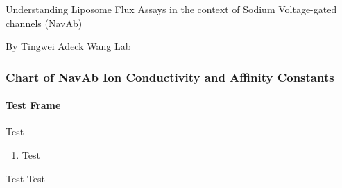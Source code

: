 \documentclass{beamer}
\begin{document}
\begin{frame}
\begin{center}
Understanding Liposome Flux Assays \linebreak in the context of Sodium Voltage-gated channels (NavAb)

By Tingwei Adeck
\linebreak
Wang Lab
\end{center}

\end{frame}



\begin{frame}
\frametitle{Chart of NavAb Ion Conductivity and Affinity Constants}
\framesubtitle{Test Frame}
Test
\begin{enumerate}
\item Test
\end{enumerate}
\begin{block}{Test}
Test
\end{block}
\end{frame}
\end{document}
